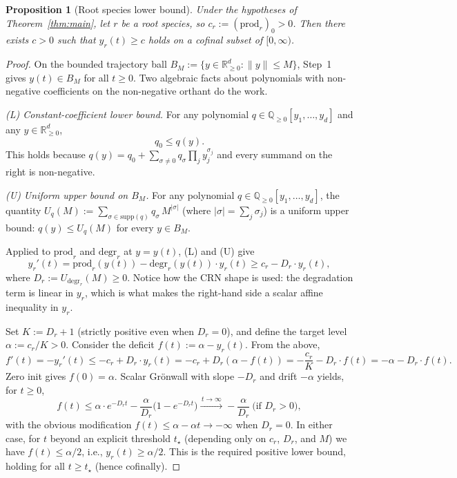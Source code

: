 \documentclass[11pt]{article}
\newtheorem{proposition}[theorem]{Proposition}
\newcommand{\R}{\mathbb{R}}
\newcommand{\Q}{\mathbb{Q}}
\newcommand{\prodpoly}{\mathrm{prod}}
\newcommand{\degrpoly}{\mathrm{degr}}
\begin{document}
\begin{proposition}[Root species lower bound]\label{prop:step2}
Under the hypotheses of Theorem~\ref{thm:main}, let $r$ be a root species, so
$c_r := (\prodpoly_r)_0 > 0$. Then there exists $c > 0$ such that
$y_r(t) \ge c$ holds on a cofinal subset of $[0, \infty)$.
\end{proposition}

\begin{proof}
On the bounded trajectory ball $B_M := \{y \in \R^d_{\ge 0} : \|y\| \le M\}$,
Step~1 gives $y(t) \in B_M$ for all $t \ge 0$. Two algebraic facts about
polynomials with non-negative coefficients on the non-negative orthant do the
work.

\smallskip
\noindent\emph{(L) Constant-coefficient lower bound.} For any polynomial
$q \in \Q_{\ge 0}[y_1, \ldots, y_d]$ and any $y \in \R^d_{\ge 0}$,
\[
  q_0 \le q(y).
\]
This holds because $q(y) = q_0 + \sum_{\sigma \ne 0} q_\sigma \prod_j y_j^{\sigma_j}$
and every summand on the right is non-negative.

\smallskip
\noindent\emph{(U) Uniform upper bound on $B_M$.} For any polynomial
$q \in \Q_{\ge 0}[y_1, \ldots, y_d]$, the quantity
$U_q(M) := \sum_{\sigma \in \mathrm{supp}(q)} q_\sigma \, M^{|\sigma|}$
(where $|\sigma| = \sum_j \sigma_j$) is a uniform upper bound:
$q(y) \le U_q(M)$ for every $y \in B_M$.

\smallskip
Applied to $\prodpoly_r$ and $\degrpoly_r$ at $y = y(t)$, (L) and (U) give
\[
  y_r'(t) = \prodpoly_r(y(t)) - \degrpoly_r(y(t)) \cdot y_r(t)
         \ge c_r - D_r \cdot y_r(t),
\]
where $D_r := U_{\degrpoly_r}(M) \ge 0$. Notice how the CRN shape is used:
the degradation term is linear in $y_r$, which is what makes the right-hand
side a scalar affine inequality in $y_r$.

Set $K := D_r + 1$ (strictly positive even when $D_r = 0$), and define the
target level $\alpha := c_r / K > 0$. Consider the deficit
$f(t) := \alpha - y_r(t)$. From the above,
\[
  f'(t) = -y_r'(t) \le -c_r + D_r \cdot y_r(t)
        = -c_r + D_r (\alpha - f(t)) = -\frac{c_r}{K} - D_r \cdot f(t)
        = -\alpha - D_r \cdot f(t).
\]
Zero init gives $f(0) = \alpha$. Scalar Gr\"onwall with slope $-D_r$ and
drift $-\alpha$ yields, for $t \ge 0$,
\[
  f(t) \le \alpha \cdot e^{-D_r t} - \frac{\alpha}{D_r}\bigl(1 - e^{-D_r t}\bigr)
         \xrightarrow{\,t \to \infty\,} -\frac{\alpha}{D_r}\ \text{(if $D_r > 0$)},
\]
with the obvious modification $f(t) \le \alpha - \alpha t \to -\infty$ when
$D_r = 0$. In either case, for $t$ beyond an explicit threshold $t_\star$
(depending only on $c_r$, $D_r$, and $M$) we have $f(t) \le \alpha/2$, i.e.,
$y_r(t) \ge \alpha/2$. This is the required positive lower bound, holding
for all $t \ge t_\star$ (hence cofinally).
\end{proof}
\end{document}
